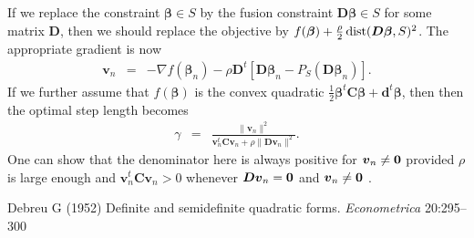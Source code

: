 \documentclass[12pt]{article}
\def\dist{\mathop{\rm dist}\nolimits}
\newcommand{\bd}{\boldsymbol{d}}
\newcommand{\bv}{\boldsymbol{v}}
\newcommand{\bC}{\boldsymbol{C}}
\newcommand{\bD}{\boldsymbol{D}}
\newcommand{\bbeta}{\boldsymbol{\beta}}
\begin{document}
If we replace the constraint $\bbeta \in S$ by the fusion constraint
$\bD\bbeta \in S$ for some matrix $\bD$, then we should replace the objective by $f(\bbeta)+\frac{\rho}{2}\dist(\bD\bbeta,S)^2$. The appropriate gradient is now
\begin{eqnarray*}
\bv_n & = &  -\nabla f(\bbeta_n)- \rho\bD^t[\bD\bbeta_n-P_{S}
(\bD\bbeta_n)].
\end{eqnarray*}
If we further assume that $f(\bbeta)$ is the convex quadratic 
$\frac{1}{2}\bbeta^t\bC\bbeta+\bd^t\bbeta$, then then the optimal step length becomes 
\begin{eqnarray*}
\gamma & = & \frac{\|\bv_n\|^2}{\bv_n^t \bC \bv_n + \rho \|\bD\bv_n\|^2}. 
\end{eqnarray*}
One can show that the denominator here is always positive for $\bv_n \ne {\bf 0}$ provided $\rho$ is large enough and $\bv_n^t \bC \bv_n>0$
whenever $\bD\bv_n = {\bf 0}$ and $\bv_n \ne {\bf 0}$ \cite{debreu52}.
 
\begin{thebibliography}{99}
Debreu G (1952) Definite and semidefinite quadratic forms. {\it Econometrica}
20:295--300
\end{thebibliography}
\end{document}
